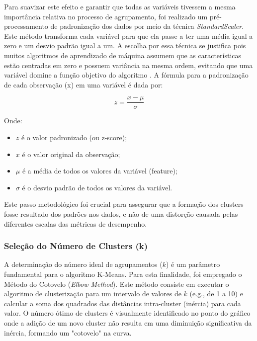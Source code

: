 Para suavizar este efeito e garantir que todas as variáveis tivessem a mesma importância relativa no processo de agrupamento, foi realizado um pré-processamento de padronização dos dados por meio da técnica \textit{StandardScaler}. Este método transforma cada variável para que ela passe a ter uma média igual a zero e um desvio padrão igual a um. A escolha por essa técnica se justifica pois muitos algoritmos de aprendizado de máquina assumem que as características estão centradas em zero e possuem variância na mesma ordem, evitando que uma variável domine a função objetivo do algoritmo \cite{scikitlearn_preprocessing}. A fórmula para a padronização de cada observação (x) em uma variável é dada por:

\begin{equation}
    z = \frac{x - \mu}{\sigma}
    \label{eq:standardscaler}
\end{equation}

Onde:
\begin{itemize}
    \item $z$ é o valor padronizado (ou z-score);
    \item $x$ é o valor original da observação;
    \item $\mu$ é a média de todos os valores da variável (feature);
    \item $\sigma$ é o desvio padrão de todos os valores da variável.
\end{itemize}

Este passo metodológico foi crucial para assegurar que a formação dos clusters fosse resultado dos padrões nos dados, e não de uma distorção causada pelas diferentes escalas das métricas de desempenho.

\subsubsection{Seleção do Número de Clusters (k)}

A determinação do número ideal de agrupamentos ($k$) é um parâmetro fundamental para o algoritmo K-Means. Para esta finalidade, foi empregado o Método do Cotovelo (\textit{Elbow Method})\cite{thorndike1953}. Este método consiste em executar o algoritmo de clusterização para um intervalo de valores de $k$ (e.g., de 1 a 10) e calcular a soma dos quadrados das distâncias intra-cluster (inércia) para cada valor. O número ótimo de clusters é visualmente identificado no ponto do gráfico onde a adição de um novo cluster não resulta em uma diminuição significativa da inércia, formando um "cotovelo" na curva.


